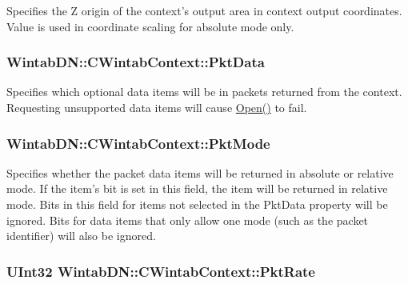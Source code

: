 Specifies the Z origin of the context's output area in context output coordinates. Value is used in coordinate scaling for absolute mode only. 

\hypertarget{class_wintab_d_n_1_1_c_wintab_context_a39ecf79368b666bcd96679d77a997e6d}{
\subsubsection[{PktData}]{ WintabDN::CWintabContext::PktData}}
\label{class_wintab_d_n_1_1_c_wintab_context_a39ecf79368b666bcd96679d77a997e6d}


Specifies which optional data items will be in packets returned from the context. Requesting unsupported data items will cause \hyperlink{class_wintab_d_n_1_1_c_wintab_context_aeacb4b849d6ae7185451d0015d740a1c}{Open()} to fail. 

\hypertarget{class_wintab_d_n_1_1_c_wintab_context_ae49db54fc9d1569c95a902058c85dd3f}{
\subsubsection[{PktMode}]{ WintabDN::CWintabContext::PktMode}}
\label{class_wintab_d_n_1_1_c_wintab_context_ae49db54fc9d1569c95a902058c85dd3f}


Specifies whether the packet data items will be returned in absolute or relative mode. If the item's bit is set in this field, the item will be returned in relative mode. Bits in this field for items not selected in the PktData property will be ignored. Bits for data items that only allow one mode (such as the packet identifier) will also be ignored. 

\hypertarget{class_wintab_d_n_1_1_c_wintab_context_a43dd191d974dedc6ca70e59ebe209ddb}{
\subsubsection[{PktRate}]{\setlength{\rightskip}{0pt plus 5cm}UInt32 WintabDN::CWintabContext::PktRate}}
\label{class_wintab_d_n_1_1_c_wintab_context_a43dd191d974dedc6ca70e59ebe209ddb}



